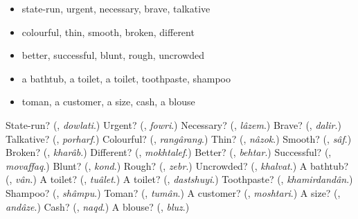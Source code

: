 \begin{itemize}
\raggedright
  \item state-run, urgent, necessary, brave, talkative
  \item colourful, thin, smooth, broken, different
  \item better, successful, blunt, rough, uncrowded
  \item a bathtub, a toilet, a toilet, toothpaste, shampoo
  \item toman, a customer, a size, cash, a blouse
\end{itemize}

\begin{tcolorbox}[breakable,colback=teal!4,colframe=teal!35!black,title={Before you move on}]
State-run? (\textbf{}, \emph{dowlati}.) Urgent? (\textbf{}, \emph{fowri}.) Necessary? (\textbf{}, \emph{lâzem}.) Brave? (\textbf{}, \emph{dalir}.) Talkative? (\textbf{}, \emph{porharf}.) Colourful? (\textbf{}, \emph{rangârang}.) Thin? (\textbf{}, \emph{nâzok}.) Smooth? (\textbf{}, \emph{sâf}.) Broken? (\textbf{}, \emph{kharâb}.) Different? (\textbf{}, \emph{mokhtalef}.) Better? (\textbf{}, \emph{behtar}.) Successful? (\textbf{}, \emph{movaffaq}.) Blunt? (\textbf{}, \emph{kond}.) Rough? (\textbf{}, \emph{zebr}.) Uncrowded? (\textbf{}, \emph{khalvat}.) A bathtub? (\textbf{}, \emph{vân}.) A toilet? (\textbf{}, \emph{tuâlet}.) A toilet? (\textbf{}, \emph{dastshuyi}.) Toothpaste? (\textbf{}, \emph{khamirdandân}.) Shampoo? (\textbf{}, \emph{shâmpu}.) Toman? (\textbf{}, \emph{tumân}.) A customer? (\textbf{}, \emph{moshtari}.) A size? (\textbf{}, \emph{andâze}.) Cash? (\textbf{}, \emph{naqd}.) A blouse? (\textbf{}, \emph{bluz}.)
\end{tcolorbox}
